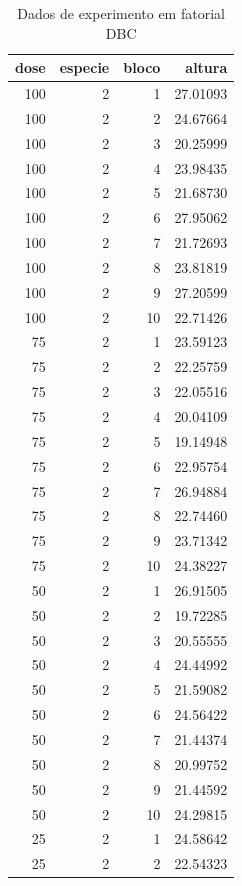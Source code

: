 \documentclass[
]{article}
\begin{document}
\begin{table}

\caption{\label{tab:unnamed-chunk-108}Dados de experimento em fatorial DBC}
\centering
\begin{tabular}[t]{r|r|r|r}
\hline
dose & especie & bloco & altura\\
\hline
100 & 2 & 1 & 27.01093\\
\hline
100 & 2 & 2 & 24.67664\\
\hline
100 & 2 & 3 & 20.25999\\
\hline
100 & 2 & 4 & 23.98435\\
\hline
100 & 2 & 5 & 21.68730\\
\hline
100 & 2 & 6 & 27.95062\\
\hline
100 & 2 & 7 & 21.72693\\
\hline
100 & 2 & 8 & 23.81819\\
\hline
100 & 2 & 9 & 27.20599\\
\hline
100 & 2 & 10 & 22.71426\\
\hline
75 & 2 & 1 & 23.59123\\
\hline
75 & 2 & 2 & 22.25759\\
\hline
75 & 2 & 3 & 22.05516\\
\hline
75 & 2 & 4 & 20.04109\\
\hline
75 & 2 & 5 & 19.14948\\
\hline
75 & 2 & 6 & 22.95754\\
\hline
75 & 2 & 7 & 26.94884\\
\hline
75 & 2 & 8 & 22.74460\\
\hline
75 & 2 & 9 & 23.71342\\
\hline
75 & 2 & 10 & 24.38227\\
\hline
50 & 2 & 1 & 26.91505\\
\hline
50 & 2 & 2 & 19.72285\\
\hline
50 & 2 & 3 & 20.55555\\
\hline
50 & 2 & 4 & 24.44992\\
\hline
50 & 2 & 5 & 21.59082\\
\hline
50 & 2 & 6 & 24.56422\\
\hline
50 & 2 & 7 & 21.44374\\
\hline
50 & 2 & 8 & 20.99752\\
\hline
50 & 2 & 9 & 21.44592\\
\hline
50 & 2 & 10 & 24.29815\\
\hline
25 & 2 & 1 & 24.58642\\
\hline
25 & 2 & 2 & 22.54323\\

\end{tabular}
\end{table}
\end{document}
